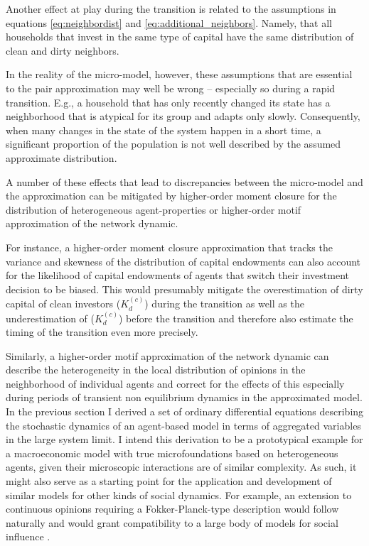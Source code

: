 Another effect at play during the transition is related to the assumptions in equations \ref{eq:neighbordist} and \ref{eq:additional_neighbors}. Namely, that all households that invest in the same type of capital have the same distribution of clean and dirty neighbors.

In the reality of the micro-model, however, these assumptions that are essential to the pair approximation may well be wrong -- especially so during a rapid transition. E.g., a household that has only recently changed its state has a neighborhood that is atypical for its group and adapts only slowly. Consequently, when many changes in the state of the system happen in a short time, a significant proportion of the population is not well described by the assumed approximate distribution.

A number of these effects that lead to discrepancies between the micro-model and the approximation can be mitigated by higher-order moment closure for the distribution of heterogeneous agent-properties or higher-order motif approximation of the network dynamic.

For instance, a higher-order moment closure approximation that tracks the variance and skewness of the distribution of capital endowments can also account for the likelihood of capital endowments of agents that switch their investment decision to be biased. This would presumably mitigate the overestimation of dirty capital of clean investors ($K_d^{(c)}$) during the transition as well as the underestimation of ($K_d^{(c)}$) before the transition and therefore also estimate the timing of the transition even more precisely. 

Similarly, a higher-order motif approximation of the network dynamic can describe the heterogeneity in the local distribution of opinions in the neighborhood of individual agents and correct for the effects of this especially during periods of transient non equilibrium dynamics in the approximated model.\\

In the previous section I derived a set of ordinary differential equations describing the stochastic dynamics of an agent-based model in terms of aggregated variables in the large system limit. I intend this derivation to be a prototypical example for a macroeconomic model with true microfoundations based on heterogeneous agents, given their microscopic interactions are of similar complexity. As such, it might also serve as a starting point for the application and development of similar models for other kinds of social dynamics. For example, an extension to continuous opinions requiring a Fokker-Planck-type description would follow naturally and would grant compatibility to a large body of models for social influence \citep[see ref.][pp. 988 f.]{Mueller-Hansen2017}.

